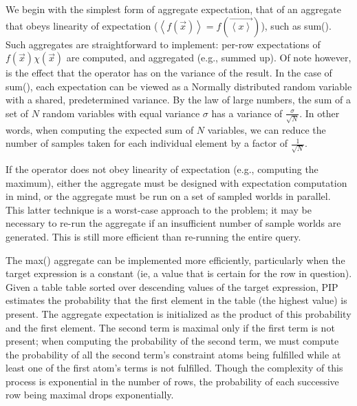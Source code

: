 We begin with the simplest form of aggregate expectation, that of an aggregate that obeys linearity of expectation ($\left<f(\vec{x})\right> = f(\vec{\left<x\right>})$), such as sum().  Such aggregates are straightforward to implement: per-row expectations of $f(\vec x)\chi(\vec x)$ are computed, and aggregated (e.g., summed up).  Of note however, is the effect that the operator has on the variance of the result.  In the case of sum(), each expectation can be viewed as a Normally distributed random variable with a shared, predetermined variance.  By the law of large numbers, the sum of a set of $N$ random variables with equal variance $\sigma$ has a variance of $\frac{\sigma}{\sqrt{N}}$.  In other words, when computing the expected sum of $N$ variables, we can reduce the number of samples taken for each individual element by a factor of $\frac{1}{\sqrt{N}}$.

If the operator does not obey linearity of expectation (e.g., computing the maximum), either the aggregate must be designed with expectation computation in mind, or the aggregate must be run on a set of sampled worlds in parallel.  This latter technique is a worst-case approach to the problem; it may be necessary to re-run the aggregate if an insufficient number of sample worlds are generated. This is still more efficient than re-running the entire query.

The max() aggregate can be implemented more efficiently, particularly when the target expression is a constant (ie, a value that is certain for the row in question).  Given a table table sorted over descending values of the target expression, PIP estimates the probability that the first element in the table (the highest value) is present.  The aggregate expectation is initialized as the product of this probability and the first element.  The second term is maximal only if the first term is not present; when computing the probability of the second term, we must compute the probability of all the second term's constraint atoms being fulfilled while at least one of the first atom's terms is not fulfilled.  Though the complexity of this process is exponential in the number of rows, the probability of each successive row being maximal drops exponentially.  %





